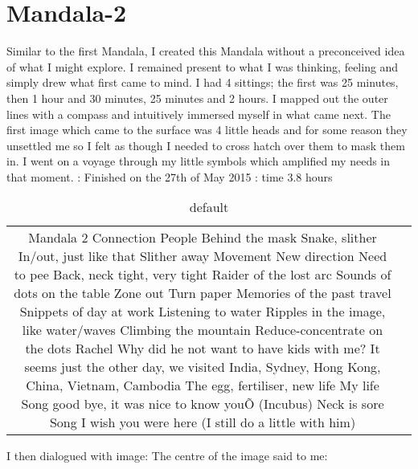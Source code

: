\chapter {Mandala-2} 




Similar to the first Mandala, I created this Mandala without a preconceived idea of what I might explore. I remained present to what I was thinking, feeling and simply drew what first came to mind. I had 4 sittings; the first was 25 minutes, then 1 hour and 30 minutes, 25 minutes and 2 hours. I mapped out the outer lines with a compass and intuitively immersed myself in what came next. The first image which came to the surface was 4 little heads and for some reason they unsettled me so I felt as though I needed to cross hatch over them to mask them in. I went on a voyage through my little symbols which amplified my needs in that moment. 
\newline
\Date: Finished on the 27th of May 2015
\Total: time 3.8 hours 
\newline 

\begin{table}[htp]
\caption{default}
\begin{center}
\begin{tabular}{|c|c|}Mandala 2
Connection
People
Behind the mask
Snake, slither
In/out, just like that
Slither away
Movement
New direction
Need to pee
Back, neck tight, very tight
Raider of the lost arc
Sounds of dots on the table 
Zone out
Turn paper
Memories of the past travel 
Snippets of day at work 
Listening to water
Ripples in the image, like water/waves 
Climbing the mountain 
Reduce-concentrate on the dots Rachel
Why did he not want to have kids with me?
It seems just the other day, we visited India, Sydney, Hong Kong, China, Vietnam, Cambodia
The egg, fertiliser, new life
My life
Song good bye, it was nice to know youÕ (Incubus)
Neck is sore
Song I wish you were here (I still do a little with him)
\end{tabular}
\end{center}
\label{default}
\end{table}%


I then dialogued with image:
The centre of the image said to me:

